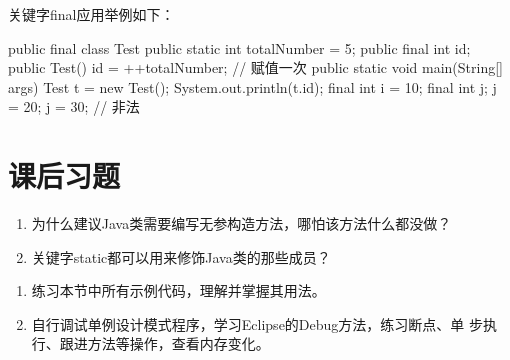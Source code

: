 关键字final应用举例如下：

\begin{javaCode}
public final class Test {
  public static int totalNumber = 5;
  public final int id;
  public Test() {
    id = ++totalNumber; // 赋值一次
  }
  public static void main(String[] args) {
    Test t = new Test();
    System.out.println(t.id);
    final int i = 10;
    final int j;
    j = 20;
    j = 30;  // 非法
  }
}
\end{javaCode}

\section{课后习题}

\begin{enumerate}
\item 为什么建议Java类需要编写无参构造方法，哪怕该方法什么都没做？
\item 关键字static都可以用来修饰Java类的那些成员？
\end{enumerate}

\begin{enumerate}
\item 练习本节中所有示例代码，理解并掌握其用法。
\item 自行调试单例设计模式程序，学习Eclipse的Debug方法，练习断点、单
  步执行、跟进方法等操作，查看内存变化。
\end{enumerate}